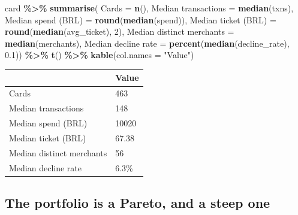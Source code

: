 \documentclass[
]{article}
\newenvironment{Shaded}{\begin{snugshade}}{\end{snugshade}}
\newcommand{\AttributeTok}[1]{\textcolor[rgb]{0.13,0.29,0.53}{#1}}
\newcommand{\DecValTok}[1]{\textcolor[rgb]{0.00,0.00,0.81}{#1}}
\newcommand{\FloatTok}[1]{\textcolor[rgb]{0.00,0.00,0.81}{#1}}
\newcommand{\FunctionTok}[1]{\textcolor[rgb]{0.13,0.29,0.53}{\textbf{#1}}}
\newcommand{\NormalTok}[1]{#1}
\newcommand{\OtherTok}[1]{\textcolor[rgb]{0.56,0.35,0.01}{#1}}
\newcommand{\SpecialCharTok}[1]{\textcolor[rgb]{0.81,0.36,0.00}{\textbf{#1}}}
\newcommand{\StringTok}[1]{\textcolor[rgb]{0.31,0.60,0.02}{#1}}
\newcounter{none} %
\begin{document}
\begin{Shaded}
\begin{Highlighting}[]
\NormalTok{card }\SpecialCharTok{\%\textgreater{}\%} \FunctionTok{summarise}\NormalTok{(}
  \AttributeTok{Cards =} \FunctionTok{n}\NormalTok{(),}
  \StringTok{\textasciigrave{}}\AttributeTok{Median transactions}\StringTok{\textasciigrave{}} \OtherTok{=} \FunctionTok{median}\NormalTok{(txns),}
  \StringTok{\textasciigrave{}}\AttributeTok{Median spend (BRL)}\StringTok{\textasciigrave{}} \OtherTok{=} \FunctionTok{round}\NormalTok{(}\FunctionTok{median}\NormalTok{(spend)),}
  \StringTok{\textasciigrave{}}\AttributeTok{Median ticket (BRL)}\StringTok{\textasciigrave{}} \OtherTok{=} \FunctionTok{round}\NormalTok{(}\FunctionTok{median}\NormalTok{(avg\_ticket), }\DecValTok{2}\NormalTok{),}
  \StringTok{\textasciigrave{}}\AttributeTok{Median distinct merchants}\StringTok{\textasciigrave{}} \OtherTok{=} \FunctionTok{median}\NormalTok{(merchants),}
  \StringTok{\textasciigrave{}}\AttributeTok{Median decline rate}\StringTok{\textasciigrave{}} \OtherTok{=} \FunctionTok{percent}\NormalTok{(}\FunctionTok{median}\NormalTok{(decline\_rate), }\FloatTok{0.1}\NormalTok{)) }\SpecialCharTok{\%\textgreater{}\%}
  \FunctionTok{t}\NormalTok{() }\SpecialCharTok{\%\textgreater{}\%} \FunctionTok{kable}\NormalTok{(}\AttributeTok{col.names =} \StringTok{"Value"}\NormalTok{)}
\end{Highlighting}
\end{Shaded}

{\def\LTcaptype{none} %
\begin{longtable}[]{@{}ll@{}}
\toprule\noalign{}
& Value \\
\midrule\noalign{}
\endhead
\bottomrule\noalign{}
\endlastfoot
Cards & 463 \\
Median transactions & 148 \\
Median spend (BRL) & 10020 \\
Median ticket (BRL) & 67.38 \\
Median distinct merchants & 56 \\
Median decline rate & 6.3\% \\
\end{longtable}
}

\subsection{The portfolio is a Pareto, and a steep
one}\label{the-portfolio-is-a-pareto-and-a-steep-one}
\end{document}
